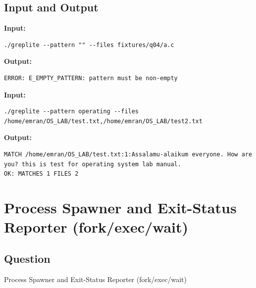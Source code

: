 \documentclass[12pt,a4paper]{article}
\begin{document}
\subsection{Input and Output}
\noindent\textbf{Input:}
\begin{verbatim}
./greplite --pattern "" --files fixtures/q04/a.c
\end{verbatim}
\vspace{0.5cm}
\noindent\textbf{Output:}
\begin{verbatim}
ERROR: E_EMPTY_PATTERN: pattern must be non-empty
\end{verbatim}


               

\noindent\textbf{Input:}
\begin{lstlisting}[breaklines=true, breakatwhitespace=false, frame=none, backgroundcolor={}, numbers=none, xleftmargin=0pt, columns=fullflexible]
./greplite --pattern operating --files /home/emran/OS_LAB/test.txt,/home/emran/OS_LAB/test2.txt
\end{lstlisting}

\vspace{0.5cm}

\noindent\textbf{Output:}
\begin{lstlisting}[breaklines=true, breakatwhitespace=false, frame=none, backgroundcolor={}, numbers=none, xleftmargin=0pt, columns=fullflexible]
MATCH /home/emran/OS_LAB/test.txt:1:Assalamu-alaikum everyone. How are you? this is test for operating system lab manual.
OK: MATCHES 1 FILES 2
\end{lstlisting}
\newpage

\section{Process Spawner and Exit-Status Reporter (fork/exec/wait)}
\subsection{Question}
Process Spawner and Exit-Status Reporter (fork/exec/wait)
\end{document}

